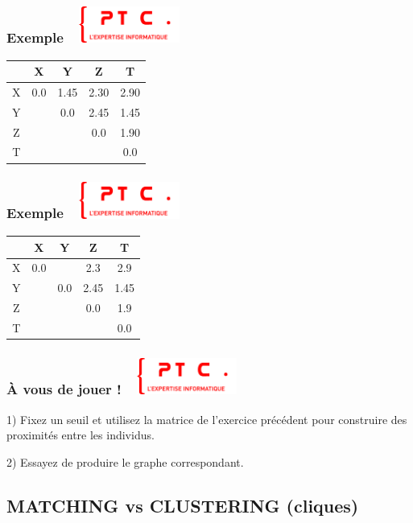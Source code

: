 \documentclass[11pt]{beamer}
\newenvironment{slide}[1]{%
\begin{frame}[environment=slide]
\frametitle{#1~\hfill~\includegraphics[height=1.2cm]{./epitech.png}}
}{%
\end{frame}
}
\begin{document}
\begin{slide}{Exemple}

\begin{tabular}{|c|c|c|c|c|}
\hline
& X & Y & Z & T \\ \hline
X &\cellcolor{black!20} \color{black!20} 0.0&1.45&2.30&2.90 \\ \hline
Y &&\cellcolor{black!20} \color{black!20} 0.0&2.45&1.45 \\ \hline
Z &&&\cellcolor{black!20} \color{black!20} 0.0&1.90 \\ \hline
T &&&&\cellcolor{black!20} \color{black!20} 0.0 \\ \hline
\end{tabular}

\end{slide}

\begin{slide}{Exemple}

\begin{tabular}{|c|c|c|c|c|}
\hline
& X & Y & Z & T \\ \hline
X &\cellcolor{black!20} \color{black!20} 0.0&\cellcolor{red!50}{1.45}&2.3&2.9 \\ \hline
Y &&\cellcolor{black!20} \color{black!20} 0.0&2.45&\cellcolor{red!50}1.45 \\ \hline
Z &&&\cellcolor{black!20} \color{black!20} 0.0&\cellcolor{red!50}1.9 \\ \hline
T &&&&\cellcolor{black!20} \color{black!20} 0.0 \\ \hline
\end{tabular}

\end{slide}


\begin{slide}{{\`A} vous de jouer !}

1) Fixez un seuil et utilisez la matrice de l'exercice précédent pour construire des proximités entre les individus. \\

\vspace{0.3cm}

2) Essayez de produire le graphe correspondant.

\end{slide}

\subsection{MATCHING vs CLUSTERING (cliques)}
\end{document}
